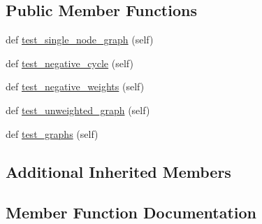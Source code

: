 \subsection*{Public Member Functions}
\begin{DoxyCompactItemize}
\item 
def \hyperlink{classnetworkx_1_1algorithms_1_1shortest__paths_1_1tests_1_1test__weighted_1_1TestJohnsonAlgorithm_a9596e20f7c5c255b23be4835511f01c0}{test\+\_\+single\+\_\+node\+\_\+graph} (self)
\item 
def \hyperlink{classnetworkx_1_1algorithms_1_1shortest__paths_1_1tests_1_1test__weighted_1_1TestJohnsonAlgorithm_aca0be85cbd22c241fc834a80ed153bf2}{test\+\_\+negative\+\_\+cycle} (self)
\item 
def \hyperlink{classnetworkx_1_1algorithms_1_1shortest__paths_1_1tests_1_1test__weighted_1_1TestJohnsonAlgorithm_aabeaa29cdcfafaa08988a650c02e5fd2}{test\+\_\+negative\+\_\+weights} (self)
\item 
def \hyperlink{classnetworkx_1_1algorithms_1_1shortest__paths_1_1tests_1_1test__weighted_1_1TestJohnsonAlgorithm_a183c14e16f4602ccb2bfde24d10a8ff2}{test\+\_\+unweighted\+\_\+graph} (self)
\item 
def \hyperlink{classnetworkx_1_1algorithms_1_1shortest__paths_1_1tests_1_1test__weighted_1_1TestJohnsonAlgorithm_a0b894a30b17b4f28986407740807d17f}{test\+\_\+graphs} (self)
\end{DoxyCompactItemize}
\subsection*{Additional Inherited Members}


\subsection{Member Function Documentation}
\mbox{\label{classnetworkx_1_1algorithms_1_1shortest__paths_1_1tests_1_1test__weighted_1_1TestJohnsonAlgorithm_a0b894a30b17b4f28986407740807d17f}} 
